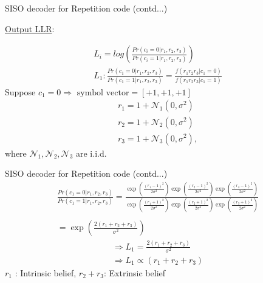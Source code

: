 \begin{frame}{SISO decoder for Repetition code (contd...)}
\begin{exampleblock}{\underline{Output LLR}:}
\end{exampleblock}
\begin{gather*}
L_i = log \left(\frac{Pr(c_i = 0|r_1, r_2, r_3)}{Pr(c_i = 1|r_1, r_2, r_3)} \right) \\
L_1: \frac{Pr(c_1 = 0|r_1, r_2, r_3)}{Pr(c_1 = 1|r_1, r_2, r_3)} = \frac{f(r_1r_2r_3|c_1 = 0)}{f(r_1r_2r_3|c_1 = 1)}
\end{gather*}
Suppose $c_1 = 0 \Rightarrow \text{ symbol vector} = [+1, +1, +1]$
\begin{gather*}
    r_1 = 1 + \mathcal{N}_1(0, \sigma ^2)\\
    r_2 = 1 + \mathcal{N}_2(0, \sigma ^2)\\
    r_3 = 1 + \mathcal{N}_3(0, \sigma ^2),
\end{gather*}
where $\mathcal{N}_1, \mathcal{N}_2, \mathcal{N}_3$ are i.i.d.

\end{frame}

\begin{frame}{SISO decoder for Repetition code (contd...)}
\begin{gather*}
    \frac{Pr(c_1 = 0|r_1, r_2, r_3)}{Pr(c_1 = 1|r_1, r_2, r_3)} = \frac{\exp(\frac{{(r_1-1)}^2}{2 \sigma ^2}) \exp(\frac{{(r_2-1)}^2}{2 \sigma ^2}) \exp(\frac{{(r_3-1)}^2}{2 \sigma ^2})}{\exp(\frac{{(r_1+1)}^2}{2 \sigma ^2}) \exp(\frac{{(r_2+1)}^2}{2 \sigma ^2}) \exp(\frac{{(r_3+1)}^2}{2 \sigma ^2})} \\~\\
     = \exp(\frac{2(r_1+r_2+r_3)}{\sigma ^2})
\end{gather*} 
\begin{gather*}
    \Rightarrow L_1 = \frac{2(r_1+r_2+r_3)}{\sigma ^2} \\
   \Rightarrow L_1 \propto (r_1 + r_2 + r_3)
\end{gather*}
$r_1$ : Intrinsic belief, $r_2 + r_3$: Extrinsic belief 
\end{frame}


